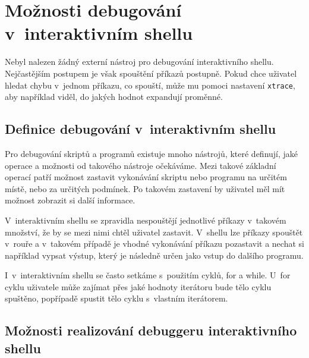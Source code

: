 \documentclass[thesis=M,czech]{FITthesis}[2012/06/26]
\begin{document}




%
%
%
%
%
\section{Možnosti debugování v~interaktivním shellu}

Nebyl nalezen žádný externí nástroj pro debugování interaktivního shellu. Nejčastějším postupem je však spouštění příkazů postupně. Pokud chce uživatel hledat chybu v~jednom příkazu, co spouští, může mu pomoci nastavení \texttt{xtrace}, aby například viděl, do jakých hodnot expandují proměnné.



%
%
\subsection{Definice debugování v~interaktivním shellu}


Pro debugování skriptů a programů existuje mnoho nástrojů, které definují, jaké operace a možnosti od takového nástroje očekáváme. Mezi takové základní operací patří možnost zastavit vykonávání skriptu nebo programu na určitém místě, nebo za určitých podmínek. Po takovém zastavení by uživatel měl mít možnost zobrazit si další informace.

V~interaktivním shellu se zpravidla nespouštějí jednotlivé příkazy v~takovém množství, že by se mezi nimi chtěl uživatel zastavit. V~shellu lze příkazy spouštět v~rouře a v~takovém případě je vhodné vykonávání příkazu pozastavit a nechat si například vypsat výstup, který je následně určen jako vstup do dalšího programu.

I~v~interaktivním shellu se často setkáme s~použitím cyklů, for a while. U~for cyklu uživatele může zajímat přes jaké hodnoty iterátoru bude tělo cyklu spuštěno, popřípadě spustit tělo cyklu s~vlastním iterátorem.




\subsection{Možnosti realizování debuggeru interaktivního shellu}
\end{document}
